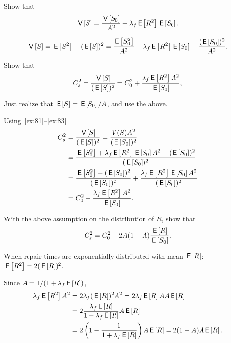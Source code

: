 \begin{extra}\label{ex:83}
Show that  
  \begin{equation*}
    \V{S} = \frac{\V{S_0}}{A^2} + \lambda_f \E{R^2} \E{S_0}.
  \end{equation*}
  \begin{solution} 
    \begin{equation*}
    \V{S} = \E{S^2} - (\E S)^2 = 
\frac{\E{S_0^2}}{A^2} + \lambda_f \E{R^2} \E{S_0} -\frac{(\E{S_0})^2}{A^2}.
    \end{equation*}
  \end{solution}
\end{extra}

\begin{exercise}
Show that
  \begin{equation*}
    C_s^2 = \frac{\V{S}}{(\E S)^2} = C_0^2 + \frac{\lambda_f \E{R^2} A^2}{\E{S_0}},
  \end{equation*}
\begin{hint} Just realize that $\E{S} = \E{S_0}/A$, and use the above.
\end{hint}
\begin{solution} Using~\cref{ex:81}--\cref{ex:83}
  \begin{align*}
C_s^2 &= \frac{\V{S}}{(\E S)^2} =\frac{V(S) A^2}{(\E{S_0})^2} \\
&=\frac{\E{S_0^2} + \lambda_f \E{R^2} \E{S_0}A^2 -(\E{S_0})^2}{(\E{S_0})^2} \\
&=\frac{\E{S_0^2} -(\E{S_0})^2}{(\E{S_0})^2} + \frac{\lambda_f \E{R^2} \E{S_0}A^2}{(\E{S_0})^2} \\
&=C_0^2 + \frac{\lambda_f \E{R^2}A^2}{\E{S_0}}.
  \end{align*}
\end{solution}
\end{exercise}


\begin{exercise}
With the above assumption on the distribution of $R$, show that
  \begin{equation*}
    C_s^2 = C_0^2 + 2 A(1-A) \frac{\E{R}}{\E{S_0}}.
  \end{equation*}

\begin{solution} 
When repair times are exponentially distributed with mean $\E{R}$:  $\E{R^2}=2(\E R)^2$. 

Since $A=1/(1+\lambda_f \E R)$, 
  \begin{equation*}
    \begin{split}
    \lambda_f \E{R^2} A^2 
&= 2\lambda_f (\E R)^2 A^2 = 2 \lambda_f \E R A A \E R \\
&= 2 \frac{\lambda_f \E R }{1+\lambda_f \E R} A \E R \\
&= 2 \left(1-\frac{1}{1+\lambda_f \E R}\right) A \E R  = 2(1-A)A \E R.
    \end{split}
  \end{equation*}
\end{solution}
\end{exercise}



